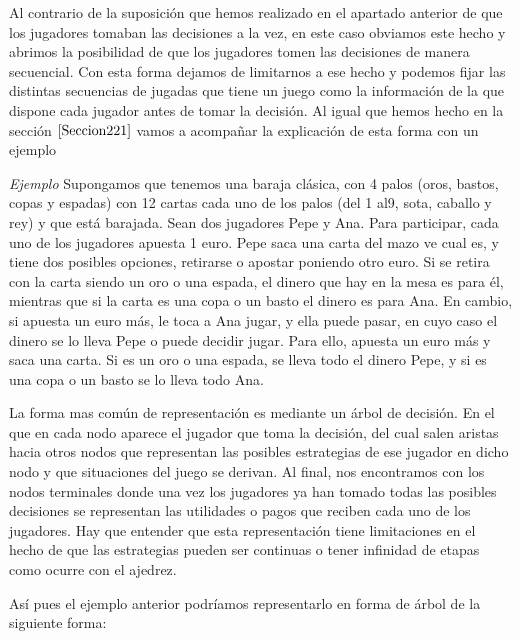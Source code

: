 \documentclass[12pt,a4paper,]{book}
\numberwithin{dummy}{section}
\theoremstyle{ocrenumbox}
\theoremstyle{blacknumex}
\theoremstyle{blacknumbox}
\theoremstyle{ocrenum}
\theoremstyle{ocrenum}
\begin{document}
Al contrario de la suposición que hemos realizado en el apartado
anterior de que los jugadores tomaban las decisiones a la vez, en este
caso obviamos este hecho y abrimos la posibilidad de que los jugadores
tomen las decisiones de manera secuencial. Con esta forma dejamos de
limitarnos a ese hecho y podemos fijar las distintas secuencias de
jugadas que tiene un juego como la información de la que dispone cada
jugador antes de tomar la decisión. Al igual que hemos hecho en la
sección \(\ref{Seccion221}\) vamos a acompañar la explicación de esta
forma con un ejemplo

\emph{Ejemplo} Supongamos que tenemos una baraja clásica, con 4 palos
(oros, bastos, copas y espadas) con 12 cartas cada uno de los palos (del
1 al9, sota, caballo y rey) y que está barajada. Sean dos jugadores Pepe
y Ana. Para participar, cada uno de los jugadores apuesta 1 euro. Pepe
saca una carta del mazo ve cual es, y tiene dos posibles opciones,
retirarse o apostar poniendo otro euro. Si se retira con la carta siendo
un oro o una espada, el dinero que hay en la mesa es para él, mientras
que si la carta es una copa o un basto el dinero es para Ana. En cambio,
si apuesta un euro más, le toca a Ana jugar, y ella puede pasar, en cuyo
caso el dinero se lo lleva Pepe o puede decidir jugar. Para ello,
apuesta un euro más y saca una carta. Si es un oro o una espada, se
lleva todo el dinero Pepe, y si es una copa o un basto se lo lleva todo
Ana.

La forma mas común de representación es mediante un árbol de decisión.
En el que en cada nodo aparece el jugador que toma la decisión, del cual
salen aristas hacia otros nodos que representan las posibles estrategias
de ese jugador en dicho nodo y que situaciones del juego se derivan. Al
final, nos encontramos con los nodos terminales donde una vez los
jugadores ya han tomado todas las posibles decisiones se representan las
utilidades o pagos que reciben cada uno de los jugadores. Hay que
entender que esta representación tiene limitaciones en el hecho de que
las estrategias pueden ser continuas o tener infinidad de etapas como
ocurre con el ajedrez.

Así pues el ejemplo anterior podríamos representarlo en forma de árbol
de la siguiente forma:
\end{document}
